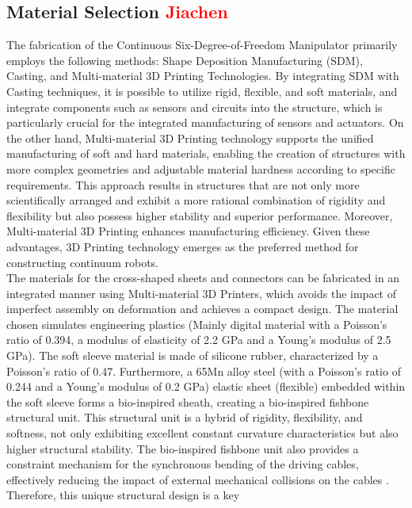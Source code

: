 \subsection{Material Selection \textcolor{red}{Jiachen}}
The fabrication of the Continuous Six-Degree-of-Freedom Manipulator primarily employs the following methods: Shape 
Deposition Manufacturing (SDM)\cite{fast_and_robust}, Casting\cite{recipe2015,high_force}, and Multi-material 3D 
Printing Technologies\cite{evolution2016,3Dprint_design}. By integrating SDM with Casting techniques, it is possible 
to utilize rigid, flexible, and soft materials, and integrate components such as sensors and circuits into the structure, 
which is particularly crucial for the integrated manufacturing of sensors and actuators. On the other hand, Multi-material 
3D Printing technology supports the unified manufacturing of soft and hard materials, enabling the creation of structures 
with more complex geometries and adjustable material hardness according to specific requirements. This approach results 
in structures that are not only more scientifically arranged and exhibit a more rational combination of rigidity and 
flexibility but also possess higher stability and superior performance. Moreover, Multi-material 3D Printing enhances 
manufacturing efficiency. Given these advantages, 3D Printing technology emerges as the preferred method for constructing 
continuum robots. \\
The materials for the cross-shaped sheets and connectors can be fabricated in an integrated manner using Multi-material 
3D Printers, which avoids the impact of imperfect assembly on deformation and achieves a compact design. The material 
chosen simulates engineering plastics (Mainly digital material with a Poisson's ratio of 0.394, a modulus of elasticity 
of 2.2 GPa and a Young's modulus of 2.5 GPa). The soft sleeve material is made of silicone rubber, characterized by a 
Poisson's ratio of 0.47. Furthermore, a 65Mn alloy steel (with a Poisson's ratio of 0.244 and a Young's modulus of 0.2 
GPa) elastic sheet (flexible) embedded within the soft sleeve forms a bio-inspired sheath, creating a bio-inspired 
fishbone structural unit. This structural unit is a hybrid of rigidity, flexibility, and softness, not only exhibiting 
excellent constant curvature characteristics but also higher structural stability. The bio-inspired fishbone unit also 
provides a constraint mechanism for the synchronous bending of the driving cables, effectively reducing the impact of 
external mechanical collisions on the cables \cite{fishboneCR}. Therefore, this unique structural design is a key 
